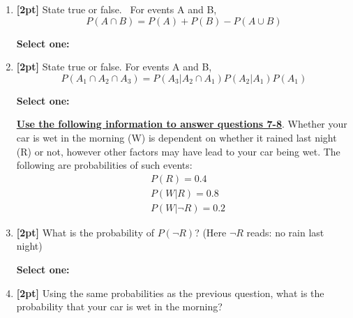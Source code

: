 \documentclass[12pt]{article}
\renewcommand{\circle}{\tikz\draw[black] (0,0) circle (1ex);}
\begin{document}
\begin{enumerate}
    \item \textbf{[2pt]} State true or false.  For events A and B, $$ P(A \cap B) = P(A) + P(B) - P(A \cup B)$$

    \textbf{Select one:}


    \item \textbf{[2pt]} State true or false. For events A and B, $$P(A_1\cap A_2 \cap A_3) = P(A_3|A_2\cap A_1)P(A_2|A_1)P(A_1)$$

    \textbf{Select one:}

    
    
    \bigskip\bigskip\bigskip
    \textbf{\underline{Use the following information to answer questions 7-8}}. Whether your car is wet in the morning (W) is dependent on whether it rained last night (R) or not, however other factors may have lead to your car being wet. The following are probabilities of such events:
    \begin{eqnarray*}
        & P(R) = 0.4\\
        & P(W | R) = 0.8\\
        & P(W | \neg R ) = 0.2
    \end{eqnarray*}
    
\clearpage
    \item \textbf{[2pt]} What is the probability of $P(\neg R)$?
(Here $ \neg R$ reads: no rain last night)

    \textbf{Select one:}


    \item \textbf{[2pt]} Using the same probabilities as the previous question, what is the probability that your car is wet in the morning?


\end{enumerate}
\end{document}
